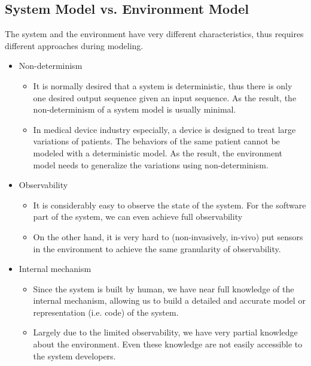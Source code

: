 \documentclass{llncs}
\begin{document}
\subsection{System Model vs. Environment Model}
The system and the environment have very different characteristics, thus requires different approaches during modeling.
\begin{itemize}
	\item Non-determinism
    \begin{itemize}
    	\item It is normally desired that a system is deterministic, thus there is only one desired output sequence given an input sequence. As the result, the non-determinism of a system model is usually minimal.
        \item In medical device industry especially, a device is designed to treat large variations of patients. The behaviors of the same patient cannot be modeled with a deterministic model. As the result, the environment model needs to generalize the variations using non-determinism. 
    \end{itemize}
    \item Observability
        \begin{itemize}
        	\item It is considerably easy to observe the state of the system. For the software part of the system, we can even achieve full observability
            \item On the other hand, it is very hard to (non-invasively, in-vivo) put sensors in the environment to achieve the same granularity of observability.
        \end{itemize}
    \item Internal mechanism 
    \begin{itemize}
    	\item Since the system is built by human, we have near full knowledge of the internal mechanism, allowing us to build a detailed and accurate model or representation (i.e. code) of the system.
        \item Largely due to the limited observability, we have very partial knowledge about the environment. Even these knowledge are not easily accessible to the system developers.
    \end{itemize}
\end{itemize} 
\end{document}
